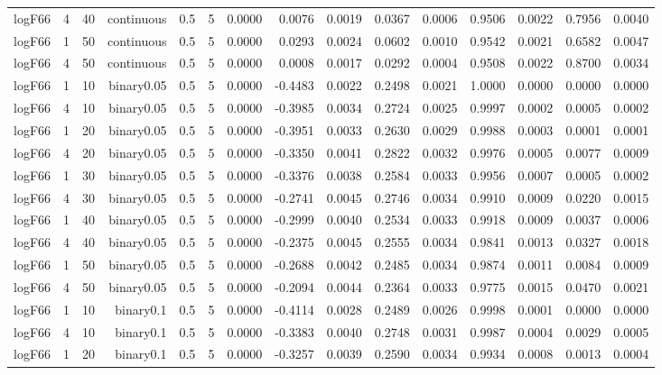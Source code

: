 \begin{longtable}{rrrrrrrrrrrrrrr}
  logF66 & 4 & 40 & continuous & 0.5 & 5 & 0.0000 & 0.0076 & 0.0019 & 0.0367 & 0.0006 & 0.9506 & 0.0022 & 0.7956 & 0.0040 \\ 
  logF66 & 1 & 50 & continuous & 0.5 & 5 & 0.0000 & 0.0293 & 0.0024 & 0.0602 & 0.0010 & 0.9542 & 0.0021 & 0.6582 & 0.0047 \\ 
  logF66 & 4 & 50 & continuous & 0.5 & 5 & 0.0000 & 0.0008 & 0.0017 & 0.0292 & 0.0004 & 0.9508 & 0.0022 & 0.8700 & 0.0034 \\ 
  logF66 & 1 & 10 & binary0.05 & 0.5 & 5 & 0.0000 & -0.4483 & 0.0022 & 0.2498 & 0.0021 & 1.0000 & 0.0000 & 0.0000 & 0.0000 \\ 
  logF66 & 4 & 10 & binary0.05 & 0.5 & 5 & 0.0000 & -0.3985 & 0.0034 & 0.2724 & 0.0025 & 0.9997 & 0.0002 & 0.0005 & 0.0002 \\ 
  logF66 & 1 & 20 & binary0.05 & 0.5 & 5 & 0.0000 & -0.3951 & 0.0033 & 0.2630 & 0.0029 & 0.9988 & 0.0003 & 0.0001 & 0.0001 \\ 
  logF66 & 4 & 20 & binary0.05 & 0.5 & 5 & 0.0000 & -0.3350 & 0.0041 & 0.2822 & 0.0032 & 0.9976 & 0.0005 & 0.0077 & 0.0009 \\ 
  logF66 & 1 & 30 & binary0.05 & 0.5 & 5 & 0.0000 & -0.3376 & 0.0038 & 0.2584 & 0.0033 & 0.9956 & 0.0007 & 0.0005 & 0.0002 \\ 
  logF66 & 4 & 30 & binary0.05 & 0.5 & 5 & 0.0000 & -0.2741 & 0.0045 & 0.2746 & 0.0034 & 0.9910 & 0.0009 & 0.0220 & 0.0015 \\ 
  logF66 & 1 & 40 & binary0.05 & 0.5 & 5 & 0.0000 & -0.2999 & 0.0040 & 0.2534 & 0.0033 & 0.9918 & 0.0009 & 0.0037 & 0.0006 \\ 
  logF66 & 4 & 40 & binary0.05 & 0.5 & 5 & 0.0000 & -0.2375 & 0.0045 & 0.2555 & 0.0034 & 0.9841 & 0.0013 & 0.0327 & 0.0018 \\ 
  logF66 & 1 & 50 & binary0.05 & 0.5 & 5 & 0.0000 & -0.2688 & 0.0042 & 0.2485 & 0.0034 & 0.9874 & 0.0011 & 0.0084 & 0.0009 \\ 
  logF66 & 4 & 50 & binary0.05 & 0.5 & 5 & 0.0000 & -0.2094 & 0.0044 & 0.2364 & 0.0033 & 0.9775 & 0.0015 & 0.0470 & 0.0021 \\ 
  logF66 & 1 & 10 & binary0.1 & 0.5 & 5 & 0.0000 & -0.4114 & 0.0028 & 0.2489 & 0.0026 & 0.9998 & 0.0001 & 0.0000 & 0.0000 \\ 
  logF66 & 4 & 10 & binary0.1 & 0.5 & 5 & 0.0000 & -0.3383 & 0.0040 & 0.2748 & 0.0031 & 0.9987 & 0.0004 & 0.0029 & 0.0005 \\ 
  logF66 & 1 & 20 & binary0.1 & 0.5 & 5 & 0.0000 & -0.3257 & 0.0039 & 0.2590 & 0.0034 & 0.9934 & 0.0008 & 0.0013 & 0.0004 \\ 

\end{longtable}
